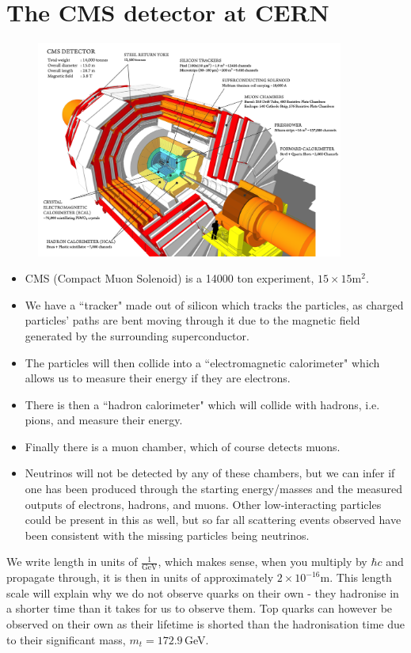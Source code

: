 \documentclass[a4paper, 11pt, normalem]{report}
\begin{document}
\section{The CMS detector at CERN}
\begin{figure}[H]
    \centering
    \includegraphics[width=0.9\textwidth]{CMS_160312_06.png}
\end{figure}
\begin{itemize}
    \item CMS (Compact Muon Solenoid) is a 14000 ton experiment, $15\times15$m$^2$.
    \item We have a ``tracker" made out of silicon which tracks the particles, as charged particles' paths are bent moving through it due to the magnetic field generated by the surrounding superconductor.
    \item The particles will then collide into a ``electromagnetic calorimeter" which allows us to measure their energy if they are electrons.
    \item There is then a ``hadron calorimeter" which will collide with hadrons, i.e. pions, and measure their energy.
    \item Finally there is a muon chamber, which of course detects muons.
    \item Neutrinos will not be detected by any of these chambers, but we can infer if one has been produced through the starting energy/masses and the measured outputs of electrons, hadrons, and muons.
        Other low-interacting particles could be present in this as well, but so far all scattering events observed have been consistent with the missing particles being neutrinos.
\end{itemize}
We write length in units of $\frac{1}{\text{GeV}}$, which makes sense, when you multiply by $\hbar c$ and propagate through, it is then in units of approximately $2\times10^{-16}$m.
This length scale will explain why we do not observe quarks on their own - they hadronise in a shorter time than it takes for us to observe them.
Top quarks can however be observed on their own as their lifetime is shorted than the hadronisation time due to their significant mass, $m_t=172.9\,$GeV.
\end{document}
